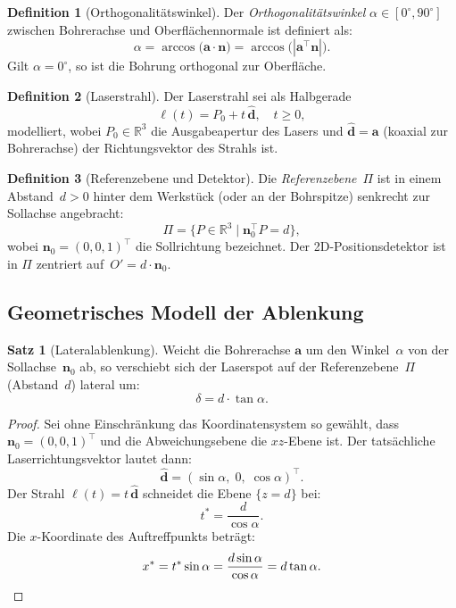 ﻿\documentclass[a4paper,12pt]{article}
\theoremstyle{definition}
\newtheorem{definition}{Definition}
\newtheorem{satz}{Satz}
\begin{document}
\begin{definition}[Orthogonalitätswinkel]
  Der \emph{Orthogonalitätswinkel} $\alpha \in [0^\circ, 90^\circ]$ zwischen Bohrerachse
  und Oberflächennormale ist definiert als:
  \[
    \alpha = \arccos\!\bigl(\mathbf{a} \cdot \mathbf{n}\bigr)
           = \arccos\!\bigl(|\mathbf{a}^\top \mathbf{n}|\bigr).
  \]
  Gilt $\alpha = 0^\circ$, so ist die Bohrung orthogonal zur Oberfläche.
\end{definition}

\begin{definition}[Laserstrahl]
  Der Laserstrahl sei als Halbgerade
  \[
    \ell(t) = P_0 + t\,\hat{\mathbf{d}}, \quad t \geq 0,
  \]
  modelliert, wobei $P_0 \in \mathbb{R}^3$ die Ausgabeapertur des Lasers
  und $\hat{\mathbf{d}} = \mathbf{a}$ (koaxial zur Bohrerachse)
  der Richtungsvektor des Strahls ist.
\end{definition}

\begin{definition}[Referenzebene und Detektor]
  Die \emph{Referenzebene}~$\Pi$ ist in einem Abstand~$d > 0$ hinter dem
  Werkstück (oder an der Bohrspitze) senkrecht zur Sollachse angebracht:
  \[
    \Pi = \bigl\{P \in \mathbb{R}^3 \;\big|\; \mathbf{n}_0^\top P = d\bigr\},
  \]
  wobei $\mathbf{n}_0 = (0,0,1)^\top$ die Sollrichtung bezeichnet.
  Der 2D-Positionsdetektor ist in $\Pi$ zentriert auf~$O' = d \cdot \mathbf{n}_0$.
\end{definition}

\subsection{Geometrisches Modell der Ablenkung}

\begin{satz}[Lateralablenkung]
  \label{satz:ablenkung}
  Weicht die Bohrerachse $\mathbf{a}$ um den Winkel~$\alpha$ von der
  Sollachse~$\mathbf{n}_0$ ab, so verschiebt sich der Laserspot auf der
  Referenzebene~$\Pi$ (Abstand~$d$) lateral um:
  \[
    \delta = d \cdot \tan\alpha.
  \]
\end{satz}

\begin{proof}
  Sei ohne Einschränkung das Koordinatensystem so gewählt, dass
  $\mathbf{n}_0 = (0,0,1)^\top$ und die Abweichungsebene die $xz$-Ebene ist.
  Der tatsächliche Laserrichtungsvektor lautet dann:
  \[
    \hat{\mathbf{d}} = (\sin\alpha,\; 0,\; \cos\alpha)^\top.
  \]
  Der Strahl $\ell(t) = t\,\hat{\mathbf{d}}$ schneidet die Ebene
  $\{z = d\}$ bei:
  \[
    t^* = \frac{d}{\cos\alpha}.
  \]
  Die $x$-Koordinate des Auftreffpunkts beträgt:
  \[
    x^* = t^* \sin\alpha = \frac{d \sin\alpha}{\cos\alpha} = d \tan\alpha. \qedhere
  \]
\end{proof}
\end{document}
